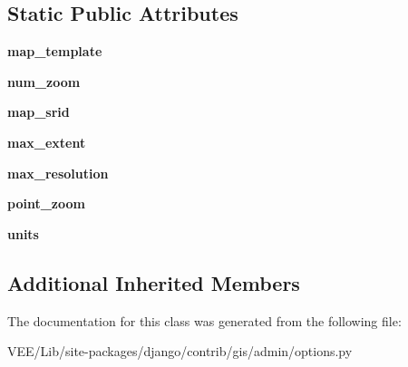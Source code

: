 \subsection*{Static Public Attributes}
\begin{DoxyCompactItemize}
\item 
\mbox{\label{classdjango_1_1contrib_1_1gis_1_1admin_1_1options_1_1_o_s_m_geo_admin_ae5b956af39b4e881ef40019ad9fab7b0}} 
{\bfseries map\+\_\+template}
\item 
\mbox{\label{classdjango_1_1contrib_1_1gis_1_1admin_1_1options_1_1_o_s_m_geo_admin_aa947c4b408dd4f4f77b8499a748cdd82}} 
{\bfseries num\+\_\+zoom}
\item 
\mbox{\label{classdjango_1_1contrib_1_1gis_1_1admin_1_1options_1_1_o_s_m_geo_admin_afdf760529e94e0191fa31ba39292b044}} 
{\bfseries map\+\_\+srid}
\item 
\mbox{\label{classdjango_1_1contrib_1_1gis_1_1admin_1_1options_1_1_o_s_m_geo_admin_a479f5646bbf8c5200fc4e24686c05e8f}} 
{\bfseries max\+\_\+extent}
\item 
\mbox{\label{classdjango_1_1contrib_1_1gis_1_1admin_1_1options_1_1_o_s_m_geo_admin_a7edd03877cbd9eb5ddcb29fcbb89d224}} 
{\bfseries max\+\_\+resolution}
\item 
\mbox{\label{classdjango_1_1contrib_1_1gis_1_1admin_1_1options_1_1_o_s_m_geo_admin_ac4ff12e5d44ecb821ea4706903dc12b1}} 
{\bfseries point\+\_\+zoom}
\item 
\mbox{\label{classdjango_1_1contrib_1_1gis_1_1admin_1_1options_1_1_o_s_m_geo_admin_a50967b42560e8db84d28dc74cab01d52}} 
{\bfseries units}
\end{DoxyCompactItemize}
\subsection*{Additional Inherited Members}


The documentation for this class was generated from the following file\+:\begin{DoxyCompactItemize}
\item 
V\+E\+E/\+Lib/site-\/packages/django/contrib/gis/admin/options.\+py\end{DoxyCompactItemize}
